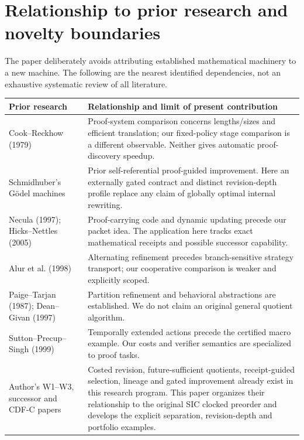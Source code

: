 \documentclass[11pt]{article}
\theoremstyle{remark}\newtheorem{remark}[theorem]{Remark}
\begin{document}
\section{Relationship to prior research and novelty boundaries}
The paper deliberately avoids attributing established mathematical machinery to a new machine. The following are the nearest identified dependencies, not an exhaustive systematic review of all literature.
\begin{center}\small
\begin{tabularx}{\textwidth}{@{}>{\raggedright\arraybackslash}p{}X@{}}
\toprule Prior research & Relationship and limit of present contribution\\\midrule
Cook--Reckhow (1979) \cite{cook} & Proof-system comparison concerns lengths/sizes and efficient translation; our fixed-policy stage comparison is a different observable. Neither gives automatic proof-discovery speedup.\\
Schmidhuber's G\"odel machines \cite{godel} & Prior self-referential proof-guided improvement. Here an externally gated contract and distinct revision-depth profile replace any claim of globally optimal internal rewriting.\\
Necula (1997); Hicks--Nettles (2005) \cite{necula,hicks} & Proof-carrying code and dynamic updating precede our packet idea. The application here tracks exact mathematical receipts and possible successor capability.\\
Alur et al. (1998) \cite{alur} & Alternating refinement precedes branch-sensitive strategy transport; our cooperative comparison is weaker and explicitly scoped.\\
Paige--Tarjan (1987); Dean--Givan (1997) \cite{paige,dean} & Partition refinement and behavioral abstractions are established. We do not claim an original general quotient algorithm.\\
Sutton--Precup--Singh (1999) \cite{options} & Temporally extended actions precede the certified macro example. Our costs and verifier semantics are specialized to proof tasks.\\
Author's W1--W3, successor and CDF-C papers \cite{costgame,quotients,receipts,successor,cdf} & Costed revision, future-sufficient quotients, receipt-guided selection, lineage and gated improvement already exist in this research program. This paper organizes their relationship to the original SIC clocked preorder and develops the explicit separation, revision-depth and portfolio examples.\\\bottomrule
\end{tabularx}
\end{center}
\end{document}
